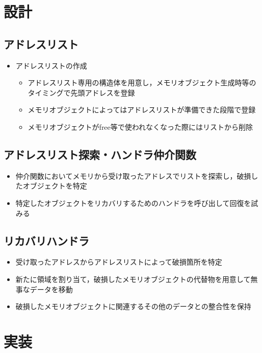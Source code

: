 \documentclass[10.5ptj,a4j]{ltjsarticle}
\providecommand{\tightlist}{%
  \setlength{\itemsep}{0pt}\setlength{\parskip}{0pt}}
\begin{document}
\section{設計}
\subsection{アドレスリスト}
\begin{itemize}\tightlist{}
  \item アドレスリストの作成
  \begin{itemize}\tightlist{}
    \item アドレスリスト専用の構造体を用意し，メモリオブジェクト生成時等のタイミングで先頭アドレスを登録
    \item メモリオブジェクトによってはアドレスリストが準備できた段階で登録
    \item メモリオブジェクトがfree等で使われなくなった際にはリストから削除
  \end{itemize}
\end{itemize}

\subsection{アドレスリスト探索・ハンドラ仲介関数}
\begin{itemize}\tightlist{}
  \item 仲介関数においてメモリから受け取ったアドレスでリストを探索し，破損したオブジェクトを特定
  \item 特定したオブジェクトをリカバリするためのハンドラを呼び出して回復を試みる
\end{itemize}

\subsection{リカバリハンドラ}
\begin{itemize}\tightlist{}
  \item 受け取ったアドレスからアドレスリストによって破損箇所を特定
  \item 新たに領域を割り当て，破損したメモリオブジェクトの代替物を用意して無事なデータを移動
  \item 破損したメモリオブジェクトに関連するその他のデータとの整合性を保持
\end{itemize}


\section{実装}
\end{document}
